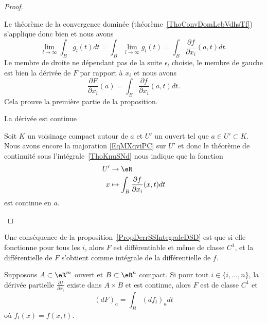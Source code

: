 \begin{proof}
\begin{subproof}
        Le théorème de la convergence dominée (théorème~\ref{ThoConvDomLebVdhsTf}) s'applique donc bien et nous avons
        \begin{equation}
            \lim_{l\to \infty} \int_Bg_l(t)dt=\int_B\lim_{l\to \infty} g_l(t)=\int_B\frac{ \partial f }{ \partial x_i }(a,t)dt.
        \end{equation}
        Le membre de droite ne dépendant pas de la suite \( \epsilon_l\) choisie, le membre de gauche est bien la dérivée de \( F\) par rapport à \( x_i\) et nous avons
        \begin{equation}
            \frac{ \partial F }{ \partial x_i }(a)=\int_B\frac{ \partial f }{ \partial x_i }(a,t)dt.
        \end{equation}
        Cela prouve la première partie de la proposition.

    \item[La dérivée est continue]

        Soit \( K\) un voisinage compact autour de \( a\) et \( U'\) un ouvert tel que \( a\in U'\subset K\). Nous avons encore la majoration \eqref{EqMXqviPC} sur \( U'\) et donc le théorème de continuité sous l'intégrale~\ref{ThoKnuSNd} nous indique que la fonction
        \begin{equation}
            \begin{aligned}
                U'&\to \eR \\
                x&\mapsto \int_{B}\frac{ \partial f }{ \partial x_i }(x,t)dt
            \end{aligned}
        \end{equation}
        est continue en \( a\).

    \end{subproof}
\end{proof}

Une conséquence de la proposition~\ref{PropDerrSSIntegraleDSD} est que si elle fonctionne pour tous les \( i\), alors \( F\) est différentiable et même de classe \( C^1\), et la différentielle de \( F\) s'obtient comme intégrale de la différentielle de \( f\).

\begin{proposition}\label{PropAOZkDsh}
    Supposons $A\subset\eR^m$ ouvert et $B\subset\eR^n$ compact. Si pour tout $i\in\{ i,\ldots,n \}$, la dérivée partielle $\frac{ \partial f }{ \partial x_i }$ existe dans $A\times B$ et est continue, alors \( F\) est de classe \( C^1\) et
    \begin{equation}
        (dF)_a=\int_B(df_t)_adt
    \end{equation}
    où \( f_t(x)=f(x,t)\).
\end{proposition}

